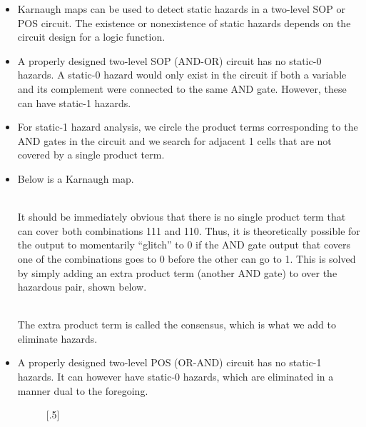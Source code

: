 \documentclass[10pt,a4paper]{article}
\begin{document}
\begin{itemize}
\begin{displayquote}
\end{displayquote}
\item Karnaugh maps can be used to detect static hazards in a two-level SOP or POS circuit. The existence or nonexistence of static hazards depends on the circuit design for a logic function. 
\item A properly designed two-level SOP (AND-OR) circuit has no static-0 hazards. A static-0 hazard would only exist in the circuit if both a variable and its complement were connected to the same AND gate. However, these can have static-1 hazards. 
\item For static-1 hazard analysis, we circle the product terms corresponding to the AND gates in the circuit and we search for adjacent 1 cells that are not covered by a single product term. 
\item Below is a Karnaugh map.\\
\\
It should be immediately obvious that there is no single product term that can cover both combinations 111 and 110. Thus, it is theoretically possible for the output to momentarily ``glitch'' to 0 if the AND gate output that covers one of the combinations goes to 0 before the other can go to 1. This is solved by simply adding an extra product term (another AND gate) to over the hazardous pair, shown below.\\
\\
The extra product term is called the consensus, which is what we add to eliminate hazards. 
\item A properly designed two-level POS (OR-AND) circuit has no static-1 hazards. It can however have static-0 hazards, which are eliminated in a manner dual to the foregoing.
\begin{figure}[h]
\captionsetup[subfigure]{font=footnotesize}
[.5\textwidth]{
\begin{tikzpicture}

\end{tikzpicture}}
\end{figure}
\end{itemize}
\end{document}
